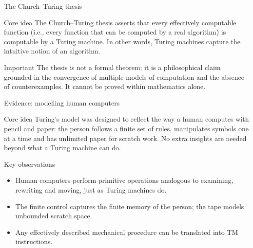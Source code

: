 \begin{frame}[t]{The Church–Turing thesis}
  \begin{tblock}{Core idea}
    The Church–Turing thesis asserts that every effectively computable
    function (i.e., every function that can be computed by a real
    algorithm) is computable by a Turing machine.  In other words,
    Turing machines capture the intuitive notion of an algorithm.
  \end{tblock}
  \begin{talert}{Important}
    The thesis is not a formal theorem; it is a philosophical claim
    grounded in the convergence of multiple models of computation and
    the absence of counterexamples.  It cannot be proved within
    mathematics alone.
  \end{talert}
  \label{fr:7.6-01}
\end{frame}

\begin{frame}[t]{Evidence: modelling human computers}
  \begin{tblock}{Core idea}
    Turing’s model was designed to reflect the way a human computes
    with pencil and paper: the person follows a finite set of rules,
    manipulates symbols one at a time and has unlimited paper for
    scratch work.  No extra insights are needed beyond what a
    Turing machine can do.
  \end{tblock}
  \begin{tblock}{Key observations}
    \begin{itemize}
      \item Human computers perform primitive operations analogous to
        examining, rewriting and moving, just as Turing machines do.
      \item The finite control captures the finite memory of the
        person; the tape models unbounded scratch space.
      \item Any effectively described mechanical procedure can be
        translated into TM instructions.
    \end{itemize}
  \end{tblock}
  \label{fr:7.6-02}
\end{frame}

